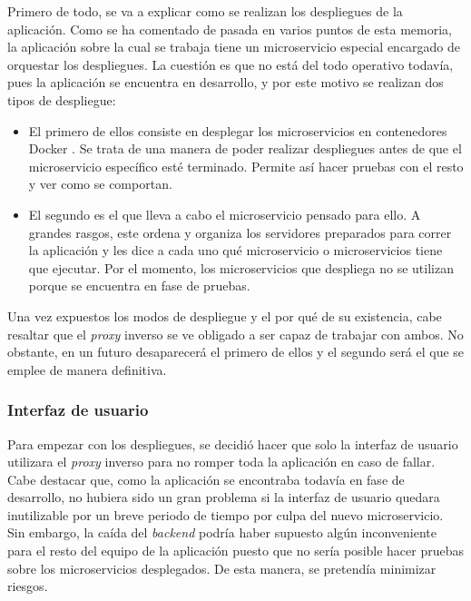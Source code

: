 \documentclass[11pt,spanish,listoffigures]{tfgetsinf}
\begin{document}
Primero de todo, se va a explicar como se realizan los despliegues de la aplicación. Como se ha comentado de pasada en varios puntos de esta memoria, la aplicación sobre la cual se trabaja tiene un microservicio especial encargado de orquestar los despliegues. La cuestión es que no está del todo operativo todavía, pues la aplicación se encuentra en desarrollo, y por este motivo se realizan dos tipos de despliegue:

\begin{itemize}

	\item El primero de ellos consiste en desplegar los microservicios en contenedores Docker \cite{Docker}. Se trata de una manera de poder realizar despliegues antes de que el microservicio específico esté terminado. Permite así hacer pruebas con el resto y ver como se comportan.

	\item El segundo es el que lleva a cabo el microservicio pensado para ello. A grandes rasgos, este ordena y organiza los servidores preparados para correr la aplicación y les dice a cada uno qué microservicio o microservicios tiene que ejecutar. Por el momento, los microservicios que despliega no se utilizan porque se encuentra en fase de pruebas.

\end{itemize}

Una vez expuestos los modos de despliegue y el por qué de su existencia, cabe resaltar que el \emph{proxy} inverso se ve obligado a ser capaz de trabajar con ambos. No obstante, en un futuro desaparecerá el primero de ellos y el segundo será el que se emplee de manera definitiva.


			\subsubsection{Interfaz de usuario}

Para empezar con los despliegues, se decidió hacer que solo la interfaz de usuario utilizara el \emph{proxy} inverso para no romper toda la aplicación en caso de fallar. Cabe destacar que, como la aplicación se encontraba todavía en fase de desarrollo, no hubiera sido un gran problema si la interfaz de usuario quedara inutilizable por un breve periodo de tiempo por culpa del nuevo microservicio. Sin embargo, la caída del \emph{backend} podría haber supuesto algún inconveniente para el resto del equipo de la aplicación puesto que no sería posible hacer pruebas sobre los microservicios desplegados. De esta manera, se pretendía minimizar riesgos.
\end{document}
